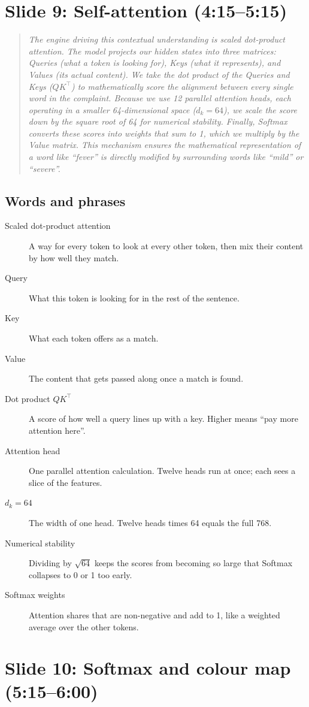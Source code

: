 \documentclass[11pt,a4paper]{article}
\newcommand{\say}[1]{\begin{quote}\itshape #1\end{quote}}
\newcommand{\terms}{\subsection*{Words and phrases}}
\begin{document}
\section{Slide 9: Self-attention (4:15--5:15)}

\say{The engine driving this contextual understanding is scaled dot-product attention. The model projects our hidden states into three matrices: Queries (what a token is looking for), Keys (what it represents), and Values (its actual content). We take the dot product of the Queries and Keys (\(QK^{\top}\)) to mathematically score the alignment between every single word in the complaint. Because we use 12 parallel attention heads, each operating in a smaller 64-dimensional space (\(d_k = 64\)), we scale the score down by the square root of 64 for numerical stability. Finally, Softmax converts these scores into weights that sum to 1, which we multiply by the Value matrix. This mechanism ensures the mathematical representation of a word like ``fever'' is directly modified by surrounding words like ``mild'' or ``severe''.}

\terms
\begin{description}
\item[Scaled dot-product attention] A way for every token to look at every other token, then mix their content by how well they match.
\item[Query] What this token is looking for in the rest of the sentence.
\item[Key] What each token offers as a match.
\item[Value] The content that gets passed along once a match is found.
\item[Dot product \(QK^{\top}\)] A score of how well a query lines up with a key. Higher means ``pay more attention here''.
\item[Attention head] One parallel attention calculation. Twelve heads run at once; each sees a slice of the features.
\item[\(d_k = 64\)] The width of one head. Twelve heads times 64 equals the full 768.
\item[Numerical stability] Dividing by \(\sqrt{64}\) keeps the scores from becoming so large that Softmax collapses to 0 or 1 too early.
\item[Softmax weights] Attention shares that are non-negative and add to 1, like a weighted average over the other tokens.
\end{description}

\section{Slide 10: Softmax and colour map (5:15--6:00)}
\end{document}
